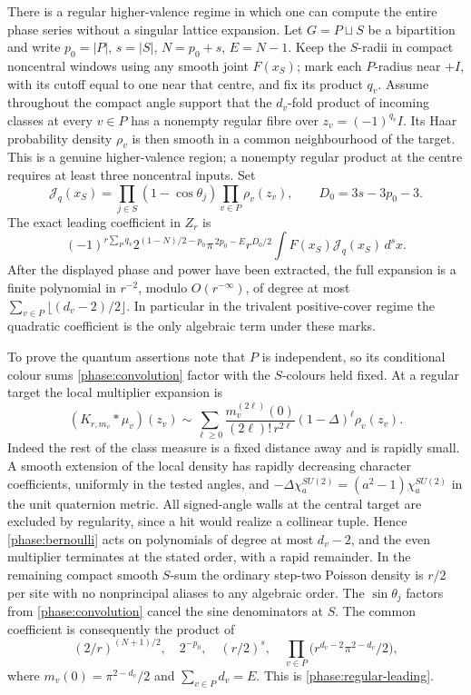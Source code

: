 There is a regular higher-valence regime in which one can compute the entire phase series without a singular lattice expansion. Let \(G=P\sqcup S\) be a bipartition and write \(p_0=|P|\), \(s=|S|\), \(N=p_0+s\), \(E=N-1\). Keep the \(S\)-radii in compact noncentral windows using any smooth joint \(F(x_S)\); mark each \(P\)-radius near \(+I\), with its cutoff equal to one near that centre, and fix its product \(q_v\). Assume throughout the compact angle support that the \(d_v\)-fold product of incoming classes at every \(v\in P\) has a nonempty regular fibre over \(z_v=(-1)^{q_v}I\). Its Haar probability density \(\rho_v\) is then smooth in a common neighbourhood of the target. This is a genuine higher-valence region; a nonempty regular product at the centre requires at least three noncentral inputs. Set
\[
 \mathcal J_q(x_S)=
   \prod_{j\in S}(1-\cos\theta_j)\prod_{v\in P}\rho_v(z_v),
 \qquad D_0=3s-3p_0-3.
\]
The exact leading coefficient in \(Z_r\) is
\begin{equation}
 (-1)^{r\sum_Pq_v}
   2^{(1-N)/2-p_0}\pi^{\,2p_0-E}r^{D_0/2}
       \int F(x_S)\mathcal J_q(x_S)\,d^s x .
 \label{phase:regular-leading}
\end{equation}
After the displayed phase and power have been extracted, the full expansion is a finite polynomial in \(r^{-2}\), modulo \(O(r^{-\infty})\), of degree at most
\(\sum_{v\in P}\lfloor(d_v-2)/2\rfloor\). In particular in the trivalent positive-cover regime the quadratic coefficient is the only algebraic term under these marks.

To prove the quantum assertions note that \(P\) is independent, so its conditional colour sums \eqref{phase:convolution} factor with the \(S\)-colours held fixed. At a regular target the local multiplier expansion is
\[
 (K_{r,m_v}*\mu_v)(z_v)\sim
       \sum_{\ell\ge0}\frac{m_v^{(2\ell)}(0)}{(2\ell)!\,r^{2\ell}}
                                   (1-\Delta)^\ell\rho_v(z_v).
\]
Indeed the rest of the class measure is a fixed distance away and is rapidly small. A smooth extension of the local density has rapidly decreasing character coefficients, uniformly in the tested angles, and
\(-\Delta\chi_a^{SU(2)}=(a^2-1)\chi_a^{SU(2)}\) in the unit quaternion metric. All signed-angle walls at the central target are excluded by regularity, since a hit would realize a collinear tuple. Hence \eqref{phase:bernoulli} acts on polynomials of degree at most \(d_v-2\), and the even multiplier terminates at the stated order, with a rapid remainder. In the remaining compact smooth \(S\)-sum the ordinary step-two Poisson density is \(r/2\) per site with no nonprincipal aliases to any algebraic order. The \(\sin\theta_j\) factors from \eqref{phase:convolution} cancel the sine denominators at \(S\). The common coefficient is consequently the product of
\[
 (2/r)^{(N+1)/2},\quad 2^{-p_0},\quad (r/2)^s,\quad
       \prod_{v\in P}\bigl(r^{d_v-2}\pi^{2-d_v}/2\bigr),
\]
where \(m_v(0)=\pi^{2-d_v}/2\) and \(\sum_{v\in P}d_v=E\). This is \eqref{phase:regular-leading}.

